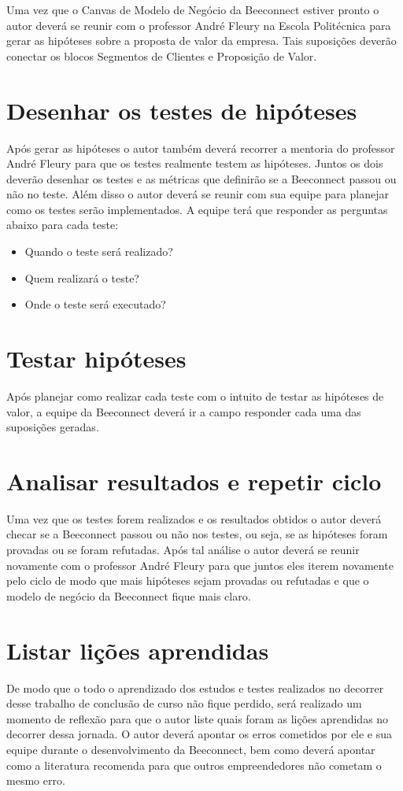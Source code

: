 Uma vez que o Canvas de Modelo de Negócio da Beeconnect estiver pronto o autor deverá se reunir com o professor André Fleury na Escola Politécnica para gerar as hipóteses sobre a proposta de valor da empresa. Tais suposições deverão conectar os blocos Segmentos de Clientes e Proposição de Valor.

\section{Desenhar os testes de hipóteses}
\label{cha:desenhar_hipoteses}
Após gerar as hipóteses o autor também deverá recorrer a mentoria do professor André Fleury para que os testes realmente testem as hipóteses. Juntos os dois deverão desenhar os testes e as métricas que definirão se a Beeconnect passou ou não no teste. 
Além disso o autor deverá se reunir com sua equipe para planejar como os testes serão implementados. A equipe terá que responder as perguntas abaixo para cada teste:
\begin{itemize}
\item Quando o teste será realizado?
\item Quem realizará o teste?
\item Onde o teste será executado?
\end{itemize}

\section{Testar hipóteses}
\label{cha:testar_hipoteses}
Após planejar como realizar cada teste com o intuito de testar as hipóteses de valor, a equipe da Beeconnect deverá ir a campo responder cada uma das suposições geradas.

\section{Analisar resultados e repetir ciclo}
\label{cha:analisar_resultados}
Uma vez que os testes forem realizados e os resultados obtidos o autor deverá checar se a Beeconnect passou ou não nos testes, ou seja, se as hipóteses foram provadas ou se foram refutadas. 
Após tal análise o autor deverá se reunir novamente com o professor André Fleury para que juntos eles iterem novamente pelo ciclo de modo que mais hipóteses sejam provadas ou refutadas e que o modelo de negócio da Beeconnect fique mais claro.

\section{Listar lições aprendidas}
\label{cha:listar_licoes_aprendidas}
De modo que o todo o aprendizado dos estudos e testes realizados no decorrer desse trabalho de conclusão de curso não fique perdido, será realizado um momento de reflexão para que o autor liste quais foram as lições aprendidas no decorrer dessa jornada. O autor deverá apontar os erros cometidos por ele e sua equipe durante o desenvolvimento da Beeconnect, bem como deverá apontar como a literatura recomenda para que outros empreendedores não cometam o mesmo erro.